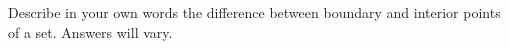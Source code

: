 {Describe in your own words the difference between boundary and interior points of a set.}
{Answers will vary.
}